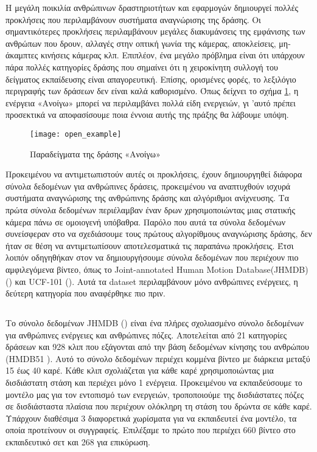 Η μεγάλη ποικιλία ανθρώπινων δραστηριοτήτων και εφαρμογών δημιουργεί πολλές προκλήσεις που περιλαμβάνουν συστήματα αναγνώρισης της δράσης.
Οι σημαντικότερες προκλήσεις περιλαμβάνουν μεγάλες διακυμάνσεις της εμφάνισης των ανθρώπων που δρουν, αλλαγές στην οπτική γωνία της κάμερας, αποκλείσεις,
μη-άκαμπτες κινήσεις κάμερας κλπ. Επιπλέον, ένα μεγάλο πρόβλημα είναι ότι υπάρχουν πάρα πολλές κατηγορίες δράσης που σημαίνει
ότι η χειροκίνητη συλλογή του δείγματος εκπαίδευσης είναι απαγορευτική. Επίσης, ορισμένες φορές, το λεξιλόγιο περιγραφής των δράσεων δεν είναι καλά καθορισμένο.
Όπως δείχνει το σχήμα \ref{fig:open_example}, η ενέργεια «Ανοίγω» μπορεί να περιλαμβάνει πολλά είδη ενεργειών, γι 'αυτό πρέπει προσεκτικά
να αποφασίσουμε ποια έννοια αυτής της πράξης θα λάβουμε υπόψη.

\begin{figure}[h]
  \centering
  \texttt{[image: open\_example]}
  \caption{Παραδείγματα της δράσης «Ανοίγω»}
  \label{fig:open_example}

\end{figure}

Προκειμένου να αντιμετωπιστούν αυτές οι προκλήσεις, έχουν δημιουργηθεί διάφορα σύνολα δεδομένων για ανθρώπινες δράσεις, προκειμένου να αναπτυχθούν
ισχυρά συστήματα αναγνώρισης της ανθρώπινης δράσης και αλγόριθμοι ανίχνευσης.
Τα πρώτα σύνολα δεδομένων περιέλαμβαν έναν δρων χρησιμοποιώντας  μιας στατικής κάμερα πάνω σε ομοιογενή υπόβαθρα.
Παρόλο που αυτά τα σύνολα δεδομένων συνείσφεραν στο να σχεδιάσουμε τους πρώτους αλγορίθμους αναγνώρισης δράσης, δεν ήταν σε θέση να αντιμετωπίσουν αποτελεσματικά τις παραπάνω
προκλήσεις.
Έτσι λοιπόν οδηγηθήκαν στον να δημιουργήσουμε σύνολα δεδομένων που περιέχουν πιο αμφιλεγόμενα βίντεο, όπως το \en Joint-annotated Human Motion Database(JHMDB) (\cite{Kuehne11}) \gr 
και \en UCF-101 (\cite{soomro2012ucf101})\gr. Αυτά τα \en dataset \gr περιλαμβάνουν μόνο ανθρώπινες ενέργειες, η δεύτερη κατηγορία που αναφέρθηκε πιο πριν.

\subsection{}
Το σύνολο δεδομένων \en JHMDB (\cite{Jhuang:ICCV:2013}) \gr είναι ένα πλήρες σχολιασμένο σύνολο δεδομένων για ανθρώπινες ενέργειες και ανθρώπινες πόζες. Αποτελείται από 21 κατηγορίες δράσεων
και 928 κλιπ που εξάγονται από την βάση δεδομένων κίνησης του ανθρώπου \en (HMDB51 \cite{Kuehne11})\gr. Αυτό το σύνολο δεδομένων περιέχει κομμένα βίντεο με διάρκεια μεταξύ
15 έως 40 καρέ. Κάθε κλιπ σχολιάζεται για κάθε καρέ χρησιμοποιώντας μια δισδιάστατη στάση και περιέχει μόνο 1 ενέργεια.
Προκειμένου να εκπαιδεύσουμε το μοντέλο μας για τον εντοπισμό των ενεργειών, τροποποιούμε της δισδιάστατες πόζες σε δισδιάσταστα πλαίσια που περιέχουν ολόκληρη τη στάση του δρώντα σε κάθε καρέ.
Υπάρχουν διαθέσιμα 3 διαφορετικά χωρίσματα για να εκπαιδευτεί ένα μοντέλο, τα οποία προτείνουν οι συγγραφείς. Επιλέξαμε το πρώτο  που περιέχει 660
βίντεο στο εκπαιδευτικό σετ και 268 για επικύρωση.


